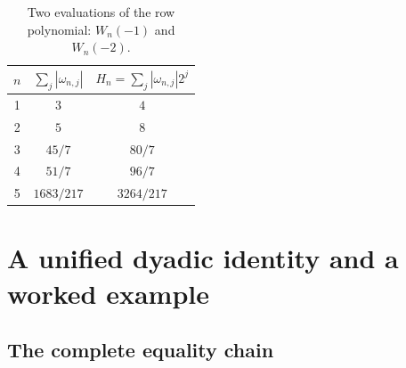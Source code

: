 \documentclass[11pt,oneside]{article}
\theoremstyle{definition}
\theoremstyle{remark}
\begin{document}
\begin{table}[ht]
\centering
\small
\begin{tabular}{@{}c c c@{}}
\toprule
$n$ & $\sum_j|\omega_{n,j}|$ & $H_n=\sum_j|\omega_{n,j}|2^j$ \\
\midrule
1 & $3$ & $4$ \\
2 & $5$ & $8$ \\
3 & $45/7$ & $80/7$ \\
4 & $51/7$ & $96/7$ \\
5 & $1683/217$ & $3264/217$ \\
\bottomrule
\end{tabular}
\caption{Two evaluations of the row polynomial: $W_n(-1)$ and $W_n(-2)$.}
\label{tab:row-constants}
\end{table}

\section{A unified dyadic identity and a worked example}
\label{sec:worked}

\subsection{The complete equality chain}
\end{document}
